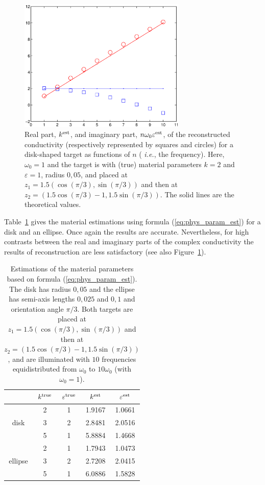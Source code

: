 \documentclass[final]{siamltex}
\numberwithin{equation}{section}
\numberwithin{figure}{section}
\numberwithin{table}{section}
\begin{document}
\begin{figure}[!h]
\centering\includegraphics[width=8cm]{k_n_estimation}
\caption{\label{fig:param_phys_est}Real part, $k^{\rm est}$, and
imaginary part, $n \omega_0 \varepsilon^{\rm est}$, of the
reconstructed conductivity (respectively represented by squares
and circles) for a disk-shaped target as functions of $n$ ({\it
i.e.}, the frequency). Here, $\omega_0=1$ and the target is with
(true) material parameters $k=2$ and $\varepsilon=1$, radius
$0,05$, and placed at $z_{1}=1.5(\cos(\pi/3),\sin(\pi/3))$ and
then at $z_{2}=(1.5\cos(\pi/3)-1,1.5\sin(\pi/3))$. The solid lines
are the theoretical values.}
\end{figure}

Table~\ref{tab:param_phys_est} gives the material estimations
using formula (\ref{eq:phys_param_est}) for a disk and an ellipse.
Once again the results are accurate. Nevertheless, for high
contrasts between the real and imaginary parts of the complex
conductivity the results of reconstruction are less satisfactory
(see also Figure~\ref{fig:param_phys_est}).

\begin{table}[!h]
\centering%
\begin{tabular}{|c||c|c||c|c|}
\cline{2-5} \multicolumn{1}{c|}{} & $k^{\rm true}$ &
$\varepsilon^{\rm true}$ & $k^{\rm est}$ & $\varepsilon^{\rm
est}$\tabularnewline \hline
 & 2 & 1 & 1.9167 & 1.0661\tabularnewline
\cline{2-5} disk & 3 & 2 & 2.8481 & 2.0516\tabularnewline
\cline{2-5}
 & 5 & 1 & 5.8884 & 1.4668\tabularnewline
\hline \hline
 & 2 & 1 & 1.7943 & 1.0473\tabularnewline
\cline{2-5} ellipse & 3 & 2 & 2.7208 & 2.0415\tabularnewline
\cline{2-5}
 & 5 & 1 & 6.0886 & 1.5828\tabularnewline
\hline
\end{tabular}

\caption{\label{tab:param_phys_est}Estimations of the material
parameters based on formula (\ref{eq:phys_param_est}). The disk
has radius $0,05$ and the ellipse has semi-axis lengths $0,025$
and $0,1$ and orientation angle $\pi/3$. Both targets are placed
at $z_{1}=1.5(\cos(\pi/3),\sin(\pi/3))$ and then at
$z_{2}=(1.5\cos(\pi/3)-1,1.5\sin(\pi/3))$, and are illuminated
with $10$ frequencies equidistributed from $\omega_0$ to $10
\omega_0$ (with $\omega_0=1$).}
\end{table}
\end{document}
